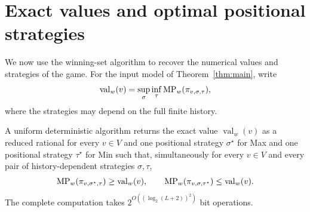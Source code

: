 \section{Exact values and optimal positional strategies}
\label{sec:full-solution}

We now use the winning-set algorithm to recover the numerical values
and strategies of the game. For the input model of
Theorem~\ref{thm:main}, write
\[
 \operatorname{val}_w(v)
 =\sup_\sigma\inf_\tau \operatorname{MP}_w(\pi_{v,\sigma,\tau}),
\]
where the strategies may depend on the full finite history.

\begin{corollary}\label{cor:full-solution}
A uniform deterministic algorithm returns the exact value
$\operatorname{val}_w(v)$ as a reduced rational for every $v\in V$
and one positional strategy $\sigma^\star$ for Max and one positional
strategy $\tau^\star$ for Min such that, simultaneously for every
$v\in V$ and every pair of history-dependent strategies $\sigma,\tau$,
\[
 \operatorname{MP}_w(\pi_{v,\sigma^\star,\tau})\ge\operatorname{val}_w(v),
 \qquad
 \operatorname{MP}_w(\pi_{v,\sigma,\tau^\star})\le\operatorname{val}_w(v).
\]
The complete computation takes
$2^{O((\log_2(L+2))^2)}$ bit operations.
\end{corollary}

